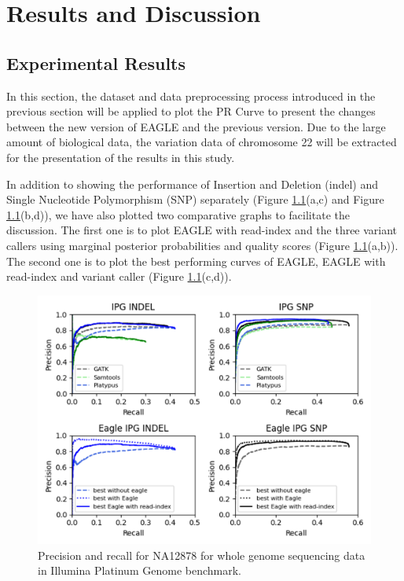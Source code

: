 \documentclass[PhD]{PHlab-thesis}
\begin{document}
\chapter{Results and Discussion}
\section{Experimental Results}
In this section, the dataset and data preprocessing process introduced in the previous section will be applied to plot the PR Curve to present the changes between the new version of EAGLE and the previous version. Due to the large amount of biological data, the variation data of chromosome 22 will be extracted for the presentation of the results in this study.

In addition to showing the performance of Insertion and Deletion (indel) and Single Nucleotide Polymorphism (SNP) separately (Figure \ref{fig:The result of IPG dataset}(a,c) and Figure \ref{fig:The result of IPG dataset}(b,d)), we have also plotted two comparative graphs to facilitate the discussion.
The first one is to plot EAGLE with read-index and the three variant callers using marginal posterior probabilities and quality scores (Figure \ref{fig:The result of IPG dataset}(a,b)).
The second one is to plot the best performing curves of EAGLE, EAGLE with read-index and variant caller (Figure \ref{fig:The result of IPG dataset}(c,d)).

\begin{figure}[h!]
	\centering
	\includegraphics[scale=0.45]{figures/IPG result.png}
	\caption{Precision and recall for NA12878 for whole genome sequencing data in Illumina Platinum Genome benchmark.}
	\label{fig:The result of IPG dataset}
\end{figure}
\end{document}
